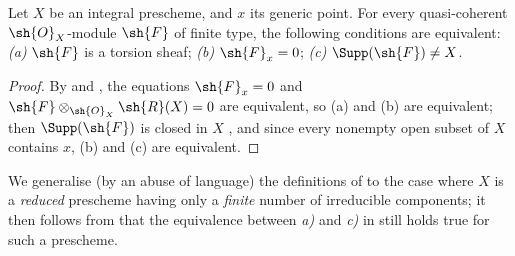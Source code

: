 \begin{proposition}[7.4.6]
\label{I.7.4.6}
Let $X$ be an integral prescheme, and $x$ its generic point.
For every quasi-coherent $\sh{O}_X$-module $\sh{F}$ of finite type, the following conditions are equivalent: \emph{(a)} $\sh{F}$ is a torsion sheaf; \emph{(b)} $\sh{F}_x=0$; \emph{(c)} $\Supp(\sh{F})\neq X$.
\end{proposition}

\begin{proof}
By  and , the equations $\sh{F}_x=0$ and $\sh{F}\otimes_{\sh{O}_X}\sh{R}(X)=0$ are equivalent, so (a) and (b) are equivalent; then $\Supp(\sh{F})$ is closed in $X$ , and since every nonempty open subset of $X$ contains $x$, (b) and (c) are equivalent.
\end{proof}

\begin{env}[7.4.7]
\label{I.7.4.7}
We generalise (by an abuse of language) the definitions of  to the case where $X$ is a \emph{reduced} prescheme having only a \emph{finite} number of irreducible components; it then follows from  that the equivalence between \emph{a)} and \emph{c)} in  still holds true for such a prescheme.
\end{env}
